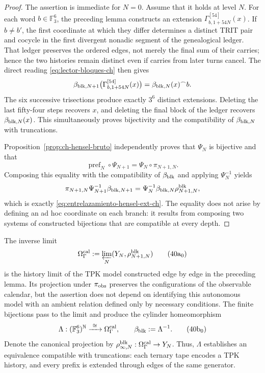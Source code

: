 \begin{proof}
The assertion is immediate for \(N=0\). Assume that it holds at level
\(N\). For each word \(b\in\mathbb F_3^6\), the preceding lemma constructs an extension
    \(\Gamma_{b,1+54N}^{[54]}(x)\). If \(b\ne b'\), the first coordinate at
which they differ determines a distinct TRIT pair and cocycle in the first
divergent nonadic segment of the genealogical ledger. That ledger preserves
the ordered edges, not merely the final sum of their carries; hence the two
histories remain distinct even if carries from later turns cancel.
The direct reading \eqref{eq:lector-bloques-ch} then gives
\begin{equation}
 \beta_{{\rm blk},N+1}
 \bigl(\Gamma_{b,1+54N}^{[54]}(x)\bigr)
 =\beta_{{\rm blk},N}(x)^\frown b.
 \label{eq:beta-concatenacion-demostrada-ch}
\end{equation}
The six successive trisections produce exactly \(3^6\) distinct extensions.
Deleting the last fifty-four steps recovers \(x\), and deleting the final
block of the ledger recovers \(\beta_{{\rm blk},N}(x)\). This simultaneously
proves bijectivity and the compatibility of \(\beta_{{\rm blk},N}\) with
truncations.

Proposition~\ref{prop:ch-hensel-bruto} independently proves that
\(\Psi_N\) is bijective and that
\[
 \operatorname{pref}_N\circ\Psi_{N+1}
 =\Psi_N\circ\pi_{N+1,N}.
\]
Composing this equality with the compatibility of \(\beta_{\rm blk}\) and
applying \(\Psi_N^{-1}\) yields
\[
 \pi_{N+1,N}\Psi_{N+1}^{-1}\beta_{{\rm blk},N+1}
 =\Psi_N^{-1}\beta_{{\rm blk},N}\rho^{\rm blk}_{N+1,N},
\]
which is exactly \eqref{eq:entrelazamiento-hensel-ext-ch}. The equality does
not arise by defining an ad hoc coordinate on each branch: it results from
composing two systems of constructed bijections that are compatible at every
depth.
\end{proof}

The inverse limit
\[
 \Omega_\Gamma^{\rm cal}:=
 \varprojlim_N(Y_N,\rho^{\rm blk}_{N+1,N})
\tag{40a$_0$}
\label{eq:omega-gamma-catalogal-ch}
\]
is the history limit of the TPK model constructed edge by edge in the
preceding lemma. Its projection under \(\pi_{\rm obs}\) preserves the
configurations of the observable calendar, but the assertion does not depend
on identifying this autonomous model with an ambient relation defined only
by necessary conditions. The finite bijections pass to the limit and produce
the cylinder homeomorphism
\[
 \Lambda:(\mathbb F_3^6)^{\mathbb N}
 \xrightarrow{\ \cong\ }\Omega_\Gamma^{\rm cal},
 \qquad
 \beta_{\rm blk}:=\Lambda^{-1}.
\tag{40b$_0$}
\label{eq:homeomorfismo-calibrado-ch}
\]
Denote the canonical projection by
\(\rho^{\rm blk}_{\infty,N}:\Omega_\Gamma^{\rm cal}\to Y_N\).
Thus, \(\Lambda\) establishes an equivalence compatible with truncations:
each ternary tape encodes a TPK history, and every prefix is extended through
edges of the same generator.

